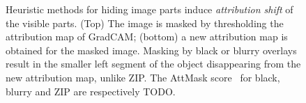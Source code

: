 \begin{figure}[t]
\begin{tabular}{ccccc}
\end{tabular}
\caption{Heuristic methods for hiding image parts induce \emph{attribution shift} of the visible parts. (Top) The image is masked by thresholding the attribution map of GradCAM; (bottom) a new attribution map is obtained for the masked image. Masking by black or blurry overlays result in the smaller left segment of the object disappearing from the new attribution map, unlike ZIP. The AttMask score~ for black, blurry and ZIP are respectively \alert{TODO}.}
\label{fig:or-blk-blr}
\end{figure}
